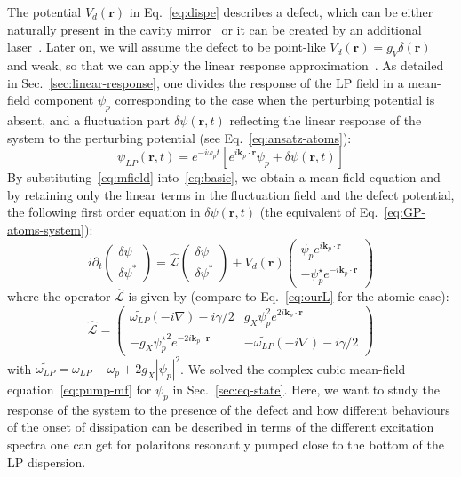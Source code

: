 The potential $V_d(\bm{r})$ in Eq.~\eqref{eq:dispe} describes a
defect, which can be either naturally present in the cavity
mirror~\cite{Amo_2009} or it can be created by an additional
laser~\cite{Amo_2010}. Later on, we will assume the defect to be
point-like $V_d(\bm{r})=g_V \delta(\bm{r})$ and weak, so that we can
apply the linear response approximation~\cite{Astrakharchik_2004}.
%
As detailed in Sec.~\ref{sec:linear-response}, one divides the
response of the LP field in a mean-field component $\psi_p$
corresponding to the case when the perturbing potential is absent, and
a fluctuation part $\delta \psi (\bm{r},t)$ reflecting the linear
response of the system to the perturbing potential (see
Eq.~\eqref{eq:ansatz-atoms}):
%
\begin{equation}
  \psi_{LP} (\bm{r},t) = e^{-i \omega_p t} \left[e^{i \bm{k}_p
      \cdot \bm{r}} \psi_p + \delta \psi (\bm{r},t)\right]
\label{eq:mfield}
\end{equation}
%
By substituting~\eqref{eq:mfield} into~\eqref{eq:basic}, we obtain a
mean-field equation and by retaining only the linear terms in the
fluctuation field and the defect potential, the following first order
equation in $\delta \psi (\bm{r},t)$ (the equivalent of
Eq.~\eqref{eq:GP-atoms-system}):
%
\begin{equation}
  i \partial_t \begin{pmatrix} \delta \psi \\ \delta
    \psi^* \end{pmatrix} = \hat{\mathcal{L}} \begin{pmatrix} \delta
    \psi \\ \delta \psi^* \end{pmatrix} + V_d(\bm{r}) \begin{pmatrix}
    \psi_p e^{i \bm{k}_p \cdot \bm{r}} \\ -\psi_p^{\star} e^{-i
      \bm{k}_p \cdot \bm{r}}
    \end{pmatrix}
\label{eq:linre}
\end{equation}
%
where the operator $\hat{\mathcal{L}}$ is given by (compare to
Eq.~\eqref{eq:ourL} for the atomic case):
%
\begin{equation}
 \hat{\mathcal{L}} = \begin{pmatrix} \widetilde{\omega_{LP}}
   (-i\nabla) - i \gamma/2 & g_X \psi_p^2 e^{2 i \bm{k}_p \cdot
     \bm{r}} \\ -g_X {\psi_p^{\star}}^2 e^{-2 i \bm{k}_p \cdot
     \bm{r}}& - \widetilde{\omega_{LP}}(-i \nabla) -
   i\gamma/2 \end{pmatrix}
\end{equation}
%
with $\widetilde{\omega_{LP}} = \omega_{LP}-\omega_p + 2g_X
|\psi_p|^2$. We solved the complex cubic mean-field
equation~\eqref{eq:pump-mf} for $\psi_p$ in
Sec.~\ref{sec:eq-state}. Here, we want to study the response of the
system to the presence of the defect and how different behaviours of
the onset of dissipation can be described in terms of the different
excitation spectra one can get for polaritons resonantly pumped close
to the bottom of the LP dispersion.

